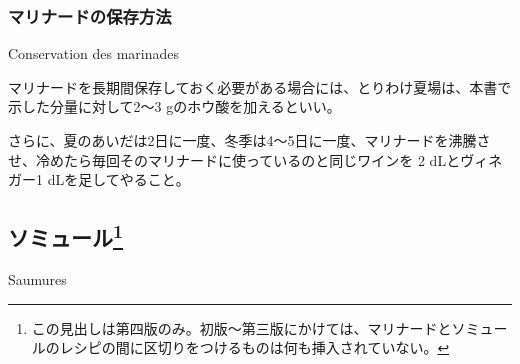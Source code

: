 \begin{recette}
\atoaki{}

\hypertarget{conservation-des-marinades}{%
\subsubsection{マリナードの保存方法}\label{conservation-des-marinades}}

\begin{frsubenv}

Conservation des marinades

\end{frsubenv}


マリナードを長期間保存しておく必要がある場合には、とりわけ夏場は、本書で示した分量に対して2〜3
gのホウ酸を加えるといい。

さらに、夏のあいだは2日に一度、冬季は4〜5日に一度、マリナードを沸騰させ、冷めたら毎回そのマリナードに使っているのと同じワインを
2 dLとヴィネガー1 dLを足してやること。

\end{recette}

\begin{main}

\hypertarget{saumures}{%
\subsection[ソミュール]{\texorpdfstring{ソミュール\footnote{この見出しは第四版のみ。初版〜第三版にかけては、マリナードとソミュールのレシピの間に区切りをつけるものは何も挿入されていない。}}{ソミュール}}\label{saumures}}

\begin{frsecbenv}

Saumures

\end{frsecbenv}

 

\end{main}

